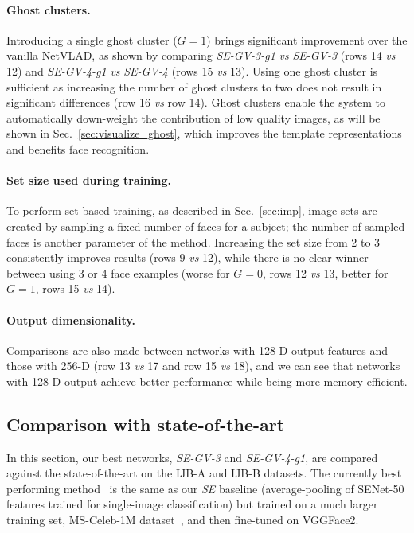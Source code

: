 \documentclass[runningheads]{llncs}
\newcommand{\vs}{\emph{vs }}
\begin{document}
\paragraph{Ghost clusters.}
Introducing a single ghost cluster ($G=1$) brings significant improvement
over the vanilla NetVLAD, as shown by comparing
\emph{SE-GV-3-g1} \vs \emph{SE-GV-3} (rows 14 \vs 12)
and
\emph{SE-GV-4-g1} \vs \emph{SE-GV-4} (rows 15 \vs 13).
Using one ghost cluster is sufficient as
increasing the number of ghost clusters to two does not result in
significant differences (row 16 \vs row 14).
Ghost clusters enable the system to automatically down-weight
the contribution of low quality images, as will be shown in
Sec.~\ref{sec:visualize_ghost}, which improves the template representations
and benefits face recognition.

\paragraph{Set size used during training.}
To perform set-based training, as described in Sec.~\ref{sec:imp},
image sets are created by sampling a fixed number of faces for a subject;
the number of sampled faces is another parameter of the method.
Increasing the set size from 2 to 3 consistently improves results
(rows 9 \vs 12), while there is no clear winner between using
3 or 4 face examples (worse for $G=0$, rows 12 \vs 13,
better for $G=1$, rows 15 \vs 14).

\paragraph{Output dimensionality.}
Comparisons are also made between networks 
with 128-D output features and those with 256-D 
(\ie row 13 \vs 17 and row 15 \vs 18),
and we can see that networks with 128-D output achieve 
better performance while being more memory-efficient.



\subsection{Comparison with state-of-the-art}\label{sec:exp:sota}

In this section, our best networks,
\emph{SE-GV-3} and \emph{SE-GV-4-g1},
are compared against the state-of-the-art
on the IJB-A and IJB-B datasets.
The currently best performing method~\cite{Cao18}
is the same as our \emph{SE} baseline
(\ie average-pooling of SENet-50 features
trained for single-image classification)
but trained on a much larger training set,
MS-Celeb-1M dataset~\cite{Guo16},
and then fine-tuned on VGGFace2.
\end{document}
